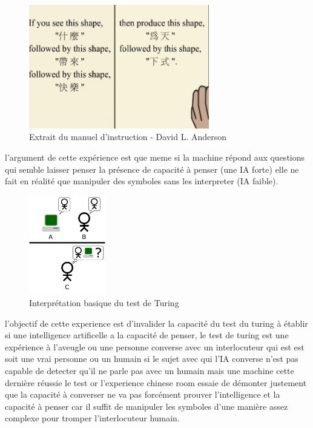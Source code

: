 \begin{figure}[H]
    \centering
    \includegraphics[width=0.7\textwidth]{Images/chineserule}
    \caption{Extrait du manuel d'instruction - David L. Anderson}
	\label{fig:chineseroom}
\end{figure}

l'argument de cette expérience est que meme si la machine répond aux questions qui semble laisser penser 
la présence de capacité à penser (une IA forte) elle ne fait en réalité que manipuler des symboles 
sans les interpreter (IA faible). \newline

\begin{figure}[h]
    \centering
    \includegraphics[width=0.3\textwidth]{Images/turingtest}
    \caption{Interprétation basique du test de Turing}
    \label{fig:turingtest}
\end{figure}

l'objectif de cette experience est d'invalider la capacité du test du turing à établir si une 
intelligence artificelle a la capacité de penser, le test de turing est une expérience à l'aveugle 
ou une personne converse avec un interlocuteur qui est est soit une vrai personne ou un humain 
si le sujet avec qui l'IA converse n'est pas capable de detecter qu'il ne parle pas avec un humain mais
une machine cette dernière réussie le test or l'experience chinese room essaie de démonter 
justement que la capacité à converser ne va pas forcément prouver l'intelligence et la capacité à penser  
car il suffit de manipuler les symboles d'une manière assez complexe pour tromper l'interlocuteur humain.
\newline

